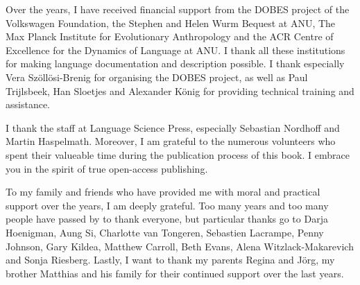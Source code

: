Over the years, I have received financial support from the DOBES project of the Volkswagen Foundation, the Stephen and Helen Wurm Bequest at ANU, The Max Planck Institute for Evolutionary Anthropology and the ACR Centre of Excellence for the Dynamics of Language at ANU. I thank all these institutions for making language documentation and description possible. I thank especially Vera Szöllösi-Brenig for organising the DOBES project, as well as Paul Trijlsbeek, Han Sloetjes and Alexander König for providing technical training and assistance.

I thank the staff at Language Science Press, especially Sebastian Nordhoff and Martin Haspelmath. Moreover, I am grateful to the numerous volunteers who spent their valueable time during the publication process of this book. I embrace you in the spirit of true open-access publishing.

To my family and friends who have provided me with moral and practical support over the years, I am deeply grateful. Too many years and too many people have passed by to thank everyone, but particular thanks go to Darja Hoenigman, Aung Si, Charlotte van Tongeren, Sebastien Lacrampe, Penny Johnson, Gary Kildea, Matthew Carroll, Beth Evans, Alena Witzlack-Makarevich and Sonja Riesberg. Lastly, I want to thank my parents Regina and Jörg, my brother Matthias and his family for their continued support over the last years.